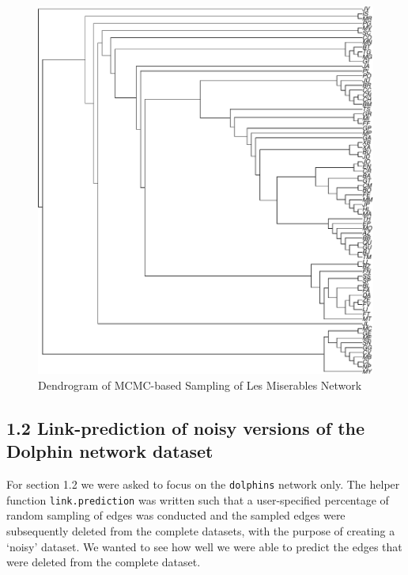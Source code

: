 \documentclass[]{article}
\begin{document}
\begin{figure}

{\centering \includegraphics{sta546_hw3_files/figure-latex/unnamed-chunk-5-1} 

}

\caption{Dendrogram of MCMC-based Sampling of Les Miserables Network}\label{fig:unnamed-chunk-5}
\end{figure}

\subsection{1.2 Link-prediction of noisy versions of the Dolphin network
dataset}\label{link-prediction-of-noisy-versions-of-the-dolphin-network-dataset}

For section 1.2 we were asked to focus on the \texttt{dolphins} network
only. The helper function \texttt{link.prediction} was written such that
a user-specified percentage of random sampling of edges was conducted
and the sampled edges were subsequently deleted from the complete
datasets, with the purpose of creating a `noisy' dataset. We wanted to
see how well we were able to predict the edges that were deleted from
the complete dataset.
\end{document}
